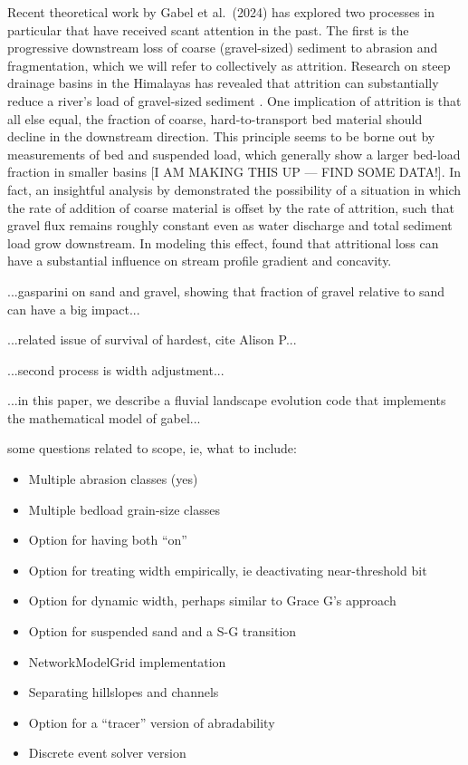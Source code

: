 \documentclass[journal abbreviation, manuscript]{copernicus}
\begin{document}
Recent theoretical work by Gabel et al.~(2024) has explored two processes in particular that have received scant attention in the past. The first is the progressive downstream loss of coarse (gravel-sized) sediment to abrasion and fragmentation, which we will refer to collectively as attrition. Research on steep drainage basins in the Himalayas has revealed that attrition can substantially reduce a river's load of gravel-sized sediment \citep{attal2006changes,dingle2017}. One implication of attrition is that all else equal, the fraction of coarse, hard-to-transport bed material should decline in the downstream direction. This principle seems to be borne out by measurements of bed and suspended load, which generally show a larger bed-load fraction in smaller basins [I AM MAKING THIS UP --- FIND SOME DATA!]. In fact, an insightful analysis by \citet{attal2006changes} demonstrated the possibility of a situation in which the rate of addition of coarse material is offset by the rate of attrition, such that gravel flux remains roughly constant even as water discharge and total sediment load grow downstream. In modeling this effect, \citet{gabel} found that attritional loss can have a substantial influence on stream profile gradient and concavity.

...gasparini on sand and gravel, showing that fraction of gravel relative to sand can have a big impact...

...related issue of survival of hardest, cite Alison P...

...second process is width adjustment...

...in this paper, we describe a fluvial landscape evolution code that implements the mathematical model of gabel...

some questions related to scope, ie, what to include:
\begin{itemize}
    \item Multiple abrasion classes (yes)
    \item Multiple bedload grain-size classes
    \item Option for having both ``on''
    \item Option for treating width empirically, ie deactivating near-threshold bit
    \item Option for dynamic width, perhaps similar to Grace G's approach
    \item Option for suspended sand and a S-G transition
    \item NetworkModelGrid implementation
    \item Separating hillslopes and channels
    \item Option for a ``tracer'' version of abradability
    \item Discrete event solver version
\end{itemize}
\end{document}
